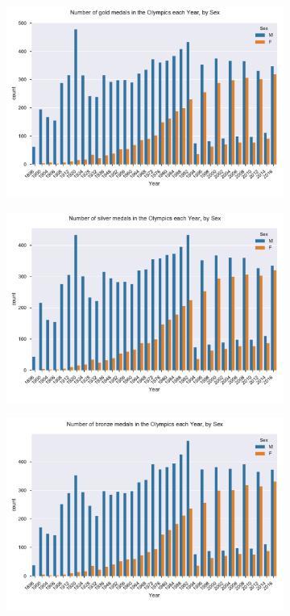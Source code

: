 \documentclass[11pt]{article} %
\begin{document}
\begin{figure}
    \centering
    \begin{subfigure}{0.5\textwidth}
    \hspace{-17mm}
    \includegraphics[scale=0.45]{Gold_year_sex.pdf}
    \end{subfigure}%
    \begin{subfigure}{0.5\textwidth}
    \includegraphics[scale=0.45]{Silver_year_sex.pdf}
    \end{subfigure}
    \begin{subfigure}{0.5\textwidth}
    \centering
    \hspace{-10mm}
    \includegraphics[scale=0.45]{Bronze_year_sex.pdf}

\end{subfigure}
\end{figure}
\end{document}
